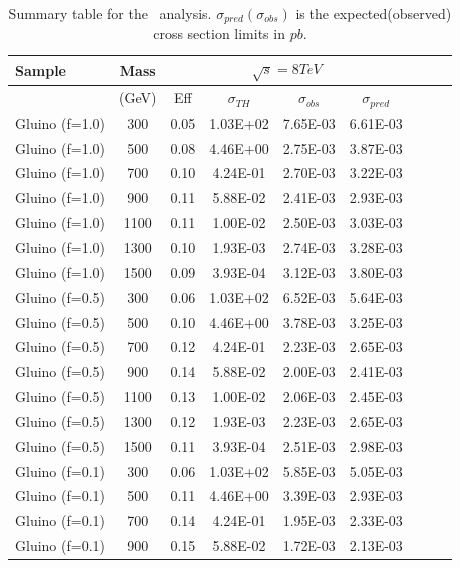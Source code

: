 \begin{table}
 \begin{center}
  \caption{Summary table for the \muononly\ analysis.
    $\sigma_{pred}(\sigma_{obs})$ is the expected(observed)
    cross section limits in $pb$.}
  \label{tab:SummaryMuOnly}
  \tiny
  \begin{tabular}{|l|c|c|c|c|c|c|c|c|} \hline
Sample & Mass  & \multicolumn{4}{c|}{$\sqrt{s}=8TeV$}  \\\hline
       & (GeV) & Eff & $\sigma_{TH}$ & $\sigma_{obs}$ & $\sigma_{pred}$ \\\hline
Gluino (f=1.0)       &  300 &   0.05 & 1.03E+02 & 7.65E-03 & 6.61E-03 \\
Gluino (f=1.0)       &  500 &   0.08 & 4.46E+00 & 2.75E-03 & 3.87E-03 \\
Gluino (f=1.0)       &  700 &   0.10 & 4.24E-01 & 2.70E-03 & 3.22E-03 \\
Gluino (f=1.0)       &  900 &   0.11 & 5.88E-02 & 2.41E-03 & 2.93E-03 \\
Gluino (f=1.0)       & 1100 &   0.11 & 1.00E-02 & 2.50E-03 & 3.03E-03 \\
Gluino (f=1.0)       & 1300 &   0.10 & 1.93E-03 & 2.74E-03 & 3.28E-03 \\
Gluino (f=1.0)       & 1500 &   0.09 & 3.93E-04 & 3.12E-03 & 3.80E-03 \\
Gluino (f=0.5)       &  300 &   0.06 & 1.03E+02 & 6.52E-03 & 5.64E-03 \\
Gluino (f=0.5)       &  500 &   0.10 & 4.46E+00 & 3.78E-03 & 3.25E-03 \\
Gluino (f=0.5)       &  700 &   0.12 & 4.24E-01 & 2.23E-03 & 2.65E-03 \\
Gluino (f=0.5)       &  900 &   0.14 & 5.88E-02 & 2.00E-03 & 2.41E-03 \\
Gluino (f=0.5)       & 1100 &   0.13 & 1.00E-02 & 2.06E-03 & 2.45E-03 \\
Gluino (f=0.5)       & 1300 &   0.12 & 1.93E-03 & 2.23E-03 & 2.65E-03 \\
Gluino (f=0.5)       & 1500 &   0.11 & 3.93E-04 & 2.51E-03 & 2.98E-03 \\
Gluino (f=0.1)       &  300 &   0.06 & 1.03E+02 & 5.85E-03 & 5.05E-03 \\
Gluino (f=0.1)       &  500 &   0.11 & 4.46E+00 & 3.39E-03 & 2.93E-03 \\
Gluino (f=0.1)       &  700 &   0.14 & 4.24E-01 & 1.95E-03 & 2.33E-03 \\
Gluino (f=0.1)       &  900 &   0.15 & 5.88E-02 & 1.72E-03 & 2.13E-03 \\

\end{tabular}
\end{center}
\end{table}
